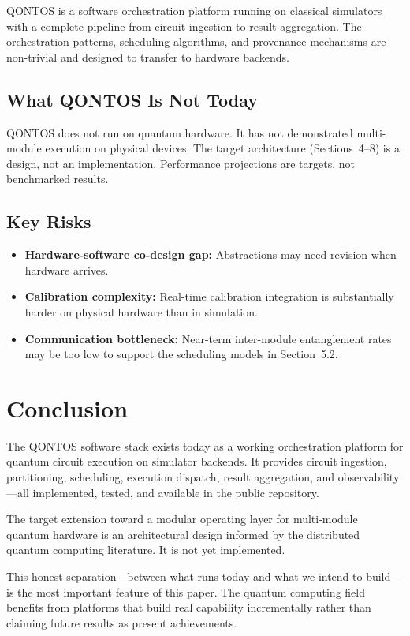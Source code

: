 \documentclass[conference]{IEEEtran}
\begin{document}
QONTOS is a software orchestration platform running on classical simulators with a complete pipeline from circuit ingestion to result aggregation. The orchestration patterns, scheduling algorithms, and provenance mechanisms are non-trivial and designed to transfer to hardware backends.

\subsection{What QONTOS Is Not Today}

QONTOS does not run on quantum hardware. It has not demonstrated multi-module execution on physical devices. The target architecture (Sections~4--8) is a design, not an implementation. Performance projections are targets, not benchmarked results.

\subsection{Key Risks}

\begin{itemize}
\item \textbf{Hardware-software co-design gap:} Abstractions may need revision when hardware arrives.
\item \textbf{Calibration complexity:} Real-time calibration integration is substantially harder on physical hardware than in simulation.
\item \textbf{Communication bottleneck:} Near-term inter-module entanglement rates may be too low to support the scheduling models in Section~5.2.
\end{itemize}

\section{Conclusion}

The QONTOS software stack exists today as a working orchestration platform for quantum circuit execution on simulator backends. It provides circuit ingestion, partitioning, scheduling, execution dispatch, result aggregation, and observability---all implemented, tested, and available in the public repository.

The target extension toward a modular operating layer for multi-module quantum hardware is an architectural design informed by the distributed quantum computing literature. It is not yet implemented.

This honest separation---between what runs today and what we intend to build---is the most important feature of this paper. The quantum computing field benefits from platforms that build real capability incrementally rather than claiming future results as present achievements.
\end{document}

